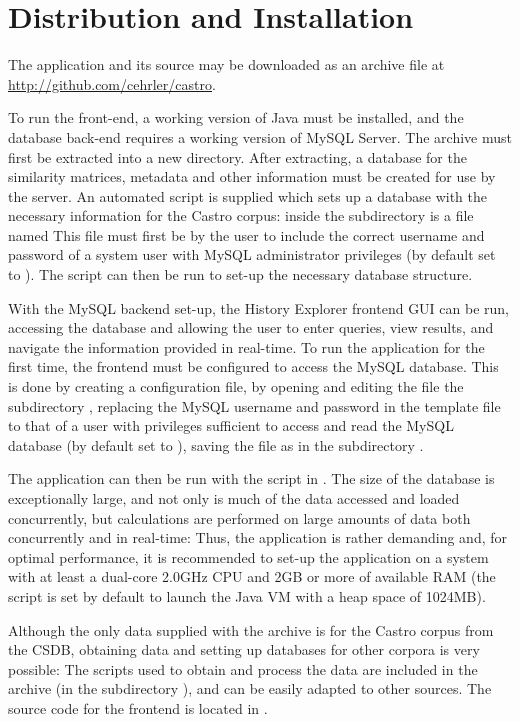 \section{Distribution and Installation}
The application and its source may be downloaded as an archive file at \url{http://github.com/cehrler/castro}.

To run the front-end, a working version of Java must be installed, and the database back-end requires a working version of MySQL Server. The archive must first be extracted into a new directory. After extracting, a database for the similarity matrices, metadata and other information must be created for use by the server. An automated script is supplied which sets up a database with the necessary information for the Castro corpus: inside the  subdirectory is a file named  This file must first be by the user to include the correct username and password of a system user with MySQL administrator privileges (by default set to ). The script can then be run to set-up the necessary database structure.

With the MySQL backend set-up, the History Explorer frontend GUI can be run, accessing the database and allowing the user to enter queries, view results, and navigate the information provided in real-time. To run the application for the first time, the frontend must be configured to access the MySQL database. This is done by creating a configuration file, by opening and editing the file  the subdirectory , replacing the MySQL username and password in the template file to that of a user with privileges sufficient to access and read the MySQL database (by default set to ), saving the file as  in the subdirectory .

The application can then be run with the script  in . The size of the database is exceptionally large, and not only is much of the data accessed and loaded concurrently, but calculations are performed on large amounts of data both concurrently and in real-time: Thus, the application is rather demanding and, for optimal performance, it is recommended to set-up the application on a system with at least a dual-core 2.0GHz CPU and 2GB or more of available RAM (the script is set by default to launch the Java VM with a heap space of 1024MB).

Although the only data supplied with the archive is for the Castro corpus from the CSDB, obtaining data and setting up databases for other corpora is very possible: The scripts used to obtain and process the data are included in the archive (in the subdirectory ), and can be easily adapted to other sources. The source code for the frontend is located in .

